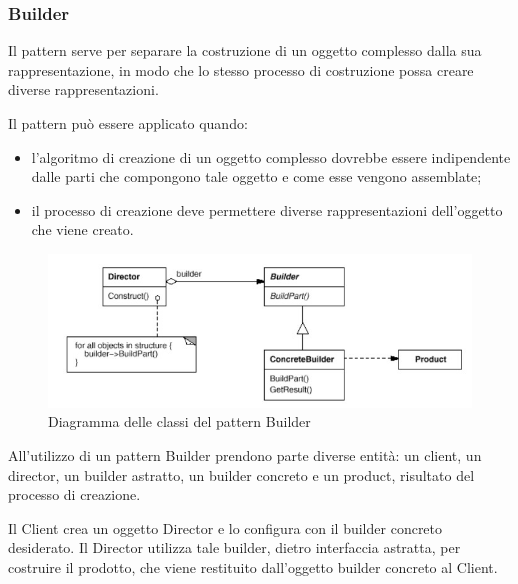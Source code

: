 \subsubsection{Builder}

Il pattern  serve per separare la costruzione di un oggetto
complesso dalla sua rappresentazione, in modo che lo stesso processo di
costruzione possa creare diverse rappresentazioni.

Il pattern può essere applicato quando:

\begin{itemize}
    \item l'algoritmo di creazione di un oggetto complesso dovrebbe essere
    indipendente dalle parti che compongono tale oggetto e come esse vengono
    assemblate;
    \item il processo di creazione deve permettere diverse rappresentazioni
    dell'oggetto che viene creato.
\end{itemize}

\begin{figure}[h!]
  \centering
  \includegraphics[scale=0.55]{imgs/builder.jpg}
  \caption{Diagramma delle classi del pattern Builder}
\end{figure}

All'utilizzo di un pattern Builder prendono parte diverse entità: un client, un
director, un builder astratto, un builder concreto e un product, risultato del
processo di creazione.

Il Client crea un oggetto Director e lo configura con il builder concreto
desiderato. Il Director utilizza tale builder, dietro interfaccia astratta, per
costruire il prodotto, che viene restituito dall'oggetto builder concreto al
Client.

